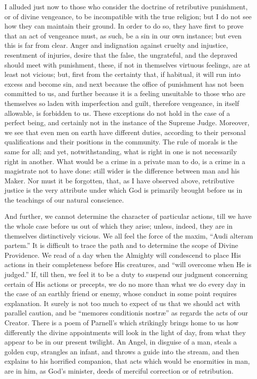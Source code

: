 I alluded just now to those who consider the doctrine of
retributive punishment, or of divine vengeance, to be incompatible
with the true religion; but I do not see how they can maintain
their ground. In order to do so, they have first to prove that an act
of vengeance must, as such, be a sin in our own instance; but even
this is far from clear. Anger and indignation against cruelty and
injustice, resentment of injuries, desire that the false, the
ungrateful, and the depraved should meet with punishment, these, if
not in themselves virtuous feelings, are at least not vicious; but,
first from the certainty that, if habitual, it will run into excess
and become sin, and next because the office of punishment has not been
committed to us, and further because it is a feeling unsuitable to
those who are themselves so laden with imperfection and guilt,
therefore vengeance, in itself allowable, is forbidden to us. These
exceptions do not hold in the case of a perfect being, and certainly
not in the instance of the Supreme Judge. Moreover, we see that even
men on earth have different duties, according to their personal
qualifications and their positions in the community. The rule of
morals is the same for all; and yet, notwithstanding, what is right in
one is not necessarily right in another. What would be a crime in a
private man to do, is a crime in a magistrate not to have done: still
wider is the difference between man and his Maker. Nor must it be
forgotten, that, as I have observed above, retributive justice is the
very attribute under which God is primarily brought before us in the
teachings of our natural conscience.

And further, we cannot determine the character of particular
actions, till we have the whole case before us out of which they
arise; unless, indeed, they are in themselves distinctively vicious.
We all feel the force of the maxim, ``Audi alteram partem.''
It is difficult to trace the path and to determine the scope of Divine
Providence. We read of a day when the Almighty will condescend to
place His actions in their completeness before His creatures, and
``will overcome when He is judged.'' If, till then, we feel it
to be a duty to suspend our judgment concerning certain of His actions
or precepts, we do no more than what we do every day in the case of an
earthly friend or enemy, whose conduct in some point requires
explanation. It surely is not too much to expect of us that we should
act with parallel caution, and be ``memores conditionis nostræ''
as regards the acts of our Creator. There is a poem of Parnell's which
strikingly brings home to us how differently the divine appointments
will look in the light of day, from what they appear to be in our
present twilight. An Angel, in disguise of a man, steals a golden cup,
strangles an infant, and throws a guide into the stream, and then
explains to his horrified companion, that acts which would be
enormities in man, are in him, as God's minister, deeds of merciful
correction or of retribution.

